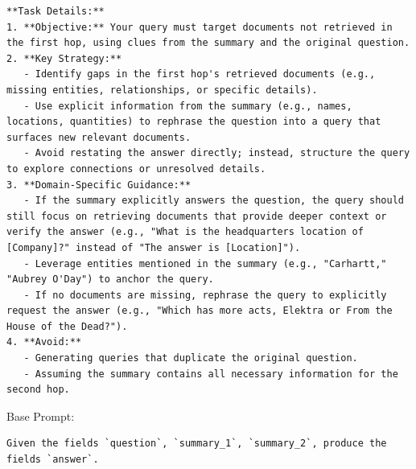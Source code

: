 \begin{instructbox}
\begin{lstlisting}[breakindent=0pt, breaklines=true, breakatwhitespace=true, frame=single, backgroundcolor=\color{blue!10}]
**Task Details:**  
1. **Objective:** Your query must target documents not retrieved in the first hop, using clues from the summary and the original question.  
2. **Key Strategy:**  
   - Identify gaps in the first hop's retrieved documents (e.g., missing entities, relationships, or specific details).  
   - Use explicit information from the summary (e.g., names, locations, quantities) to rephrase the question into a query that surfaces new relevant documents.  
   - Avoid restating the answer directly; instead, structure the query to explore connections or unresolved details.  
3. **Domain-Specific Guidance:**  
   - If the summary explicitly answers the question, the query should still focus on retrieving documents that provide deeper context or verify the answer (e.g., "What is the headquarters location of [Company]?" instead of "The answer is [Location]").  
   - Leverage entities mentioned in the summary (e.g., "Carhartt," "Aubrey O'Day") to anchor the query.  
   - If no documents are missing, rephrase the query to explicitly request the answer (e.g., "Which has more acts, Elektra or From the House of the Dead?").  
4. **Avoid:**  
   - Generating queries that duplicate the original question.  
   - Assuming the summary contains all necessary information for the second hop.
\end{lstlisting}
\end{instructbox}\begin{instructbox}
Base Prompt:
\begin{lstlisting}[breakindent=0pt, breaklines=true, breakatwhitespace=true, frame=single, backgroundcolor=\color{gray!10}]
Given the fields `question`, `summary_1`, `summary_2`, produce the fields `answer`.
\end{lstlisting}


\end{instructbox}
